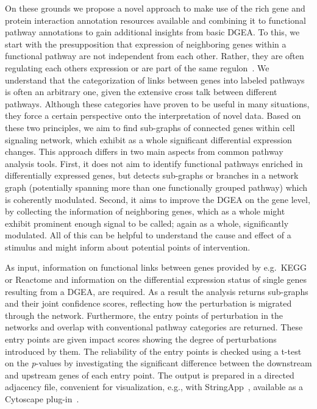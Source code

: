 \documentclass[10pt,a4paper,twocolumn]{article}
\begin{document}
    On these grounds we propose a novel approach to make use of the rich gene
	and protein interaction annotation resources available and combining it to functional pathway annotations to gain additional insights from basic DGEA. To this, we start with the
	presupposition that expression of neighboring genes within a functional
	pathway are not independent from each other. Rather, they are often
	regulating each others expression or are part of the same
	regulon~\cite{Michalak}. We understand that the categorization of links
	between genes into labeled pathways is often an arbitrary one, given the
	extensive cross talk between different pathways. Although these categories
	have proven to be useful in many situations, they force a certain
	perspective onto the interpretation of novel data. Based on these two
	principles, we aim to find sub-graphs of connected genes within cell
	signaling network, which exhibit as a whole significant differential
	expression changes. This approach differs in two main aspects from common
	pathway analysis tools. First, it does not aim to identify functional
	pathways enriched in differentially expressed genes, but detects sub-graphs
	or branches in a network graph (potentially spanning more than one
	functionally grouped pathway) which is coherently modulated. Second, it
	aims to improve the DGEA on the gene level, by collecting the information
	of neighboring genes, which as a whole might exhibit prominent enough
	signal to be called; again as a whole, significantly modulated. All of this can be helpful to understand the cause and effect of a stimulus and might inform about potential points of intervention.
	
	As input, information on functional links between genes provided by
	e.g.~KEGG or Reactome and information on the differential expression status
	of single genes resulting from a DGEA, are required. As a result the
	analysis returns sub-graphs and their joint confidence scores, reflecting
	how the perturbation is migrated through the network. Furthermore, the
	entry points of perturbation in the networks and overlap with conventional
	pathway categories are returned. These entry points are given impact scores showing the degree of perturbations introduced by them. The reliability of the entry points is checked using a t-test on the \textit{p}-values by investigating the significant difference between the downstream and upstream genes of each entry point. The output is prepared in a directed
	adjacency file, convenient for visualization, e.g., with
	StringApp~\cite{StringApp}, available as a Cytoscape plug-in~\cite{Cyto}.
	
\end{document}
